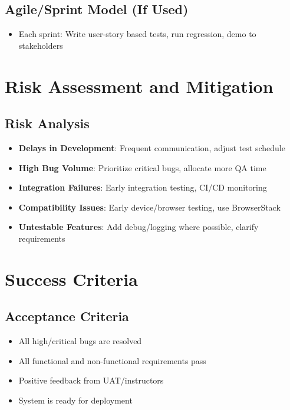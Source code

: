 \documentclass[a4paper,11pt]{scrartcl}
\begin{document}
\subsection{Agile/Sprint Model (If Used)}
\begin{itemize}[leftmargin=*]
    \item Each sprint: Write user-story based tests, run regression, demo to stakeholders
\end{itemize}

\section{Risk Assessment and Mitigation}

\subsection{Risk Analysis}
\begin{itemize}[leftmargin=*]
    \item \textbf{Delays in Development}: Frequent communication, adjust test schedule
    \item \textbf{High Bug Volume}: Prioritize critical bugs, allocate more QA time
    \item \textbf{Integration Failures}: Early integration testing, CI/CD monitoring
    \item \textbf{Compatibility Issues}: Early device/browser testing, use BrowserStack
    \item \textbf{Untestable Features}: Add debug/logging where possible, clarify requirements
\end{itemize}

\section{Success Criteria}

\subsection{Acceptance Criteria}
\begin{itemize}[leftmargin=*]
    \item All high/critical bugs are resolved
    \item All functional and non-functional requirements pass
    \item Positive feedback from UAT/instructors
    \item System is ready for deployment
\end{itemize}
\end{document}
